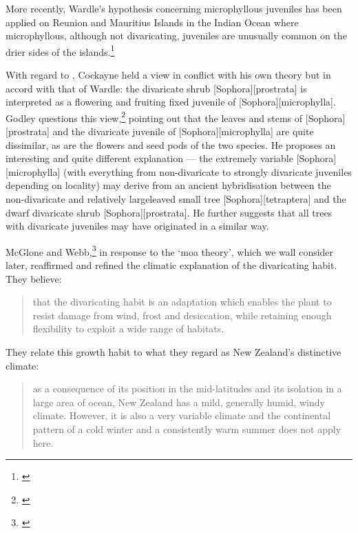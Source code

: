 More recently, Wardle's hypothesis concerning microphyllous juveniles has been applied on Reunion and Mauritius Islands in the Indian Ocean where microphyllous, although not divaricating, juveniles are unusually common on the drier sides of the islands.\footnote{\cite{friedmann1976observations}}

With regard to , Cockayne held a view in conflict with his own theory but in accord with that of Wardle: the divaricate shrub [Sophora][prostrata] is interpreted as a flowering and fruiting fixed juvenile of [Sophora][microphylla].
Godley questions this view,\footnote{\cite{godley1979leonard}} pointing out that the leaves and stems of [Sophora][prostrata] and the divaricate juvenile of [Sophora][microphylla] are quite dissimilar, as are the flowers and seed pods of the two species.
He proposes an interesting and quite different explanation --- the extremely variable [Sophora][microphylla] (with everything from non-divaricate to strongly divaricate juveniles depending on locality) may derive from an ancient hybridisation between the non-divaricate and relatively largeleaved small tree [Sophora][tetraptera] and the dwarf divaricate shrub [Sophora][prostrata].
He further suggests that all trees with divaricate juveniles may have originated in a similar way.

McGlone and Webb,\footnote{\cite{mcglone1981selective}} in response to the `moa theory', which we wall consider later, reaffirmed and refined the climatic explanation of the divaricating habit.
They believe:

\begin{quote}
	that the divaricating habit is an adaptation which enables the plant to resist damage from wind, frost and desiccation, while retaining enough flexibility to exploit a wide range of habitats.
\end{quote}

They relate this growth habit to what they regard as New Zealand's distinctive climate:

\begin{quote}
	as a consequence of its position in the mid-latitudes and its isolation in a large area of ocean, New Zealand has a mild, generally humid, windy climate.
	However, it is also a very variable climate and the continental pattern of a cold winter and a consistently warm summer does not apply here.
\end{quote}

